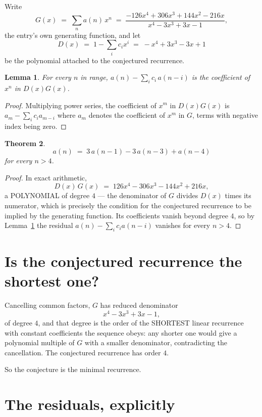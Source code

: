 \documentclass[11pt,a4paper]{article}
\theoremstyle{plain}
\newtheorem{theorem}{Theorem}
\newtheorem{lemma}[theorem]{Lemma}
\theoremstyle{definition}
\begin{document}
Write
\[
G(x)\;=\;\sum_{n}a(n)\,x^{n}\;=\;\frac{- 126 x^{4} + 306 x^{3} + 144 x^{2} - 216 x}{x^{4} - 3 x^{3} + 3 x - 1},
\]
the entry's own generating function, and let
\[
D(x)\;=\;1-\sum_i c_i x^{i}\;=\;- x^{4} + 3 x^{3} - 3 x + 1
\]
be the polynomial attached to the conjectured recurrence.

\begin{lemma}\label{lem:key}
For every $n$ in range, $a(n)-\sum_i c_i\,a(n-i)$ is the coefficient of $x^{n}$ in
$D(x)G(x)$.
\end{lemma}

\begin{proof}
Multiplying power series, the coefficient of $x^{m}$ in $D(x)G(x)$ is
$a_m-\sum_i c_i a_{m-i}$ where $a_m$ denotes the coefficient of $x^{m}$ in $G$, terms with
negative index being zero.
\end{proof}

\begin{theorem}
\[
a(n)\;=\;3\,a(n-1) - 3\,a(n-3) + a(n-4)
\]
for every $n>4$.
\end{theorem}

\begin{proof}
In exact arithmetic,
\[
D(x)\,G(x)\;=\;126 x^{4} - 306 x^{3} - 144 x^{2} + 216 x,
\]
a POLYNOMIAL of degree $4$ --- the denominator of $G$ divides $D(x)$ times its numerator,
which is precisely the condition for the conjectured recurrence to be implied by the
generating function. Its coefficients vanish beyond degree $4$, so by
Lemma~\ref{lem:key} the residual $a(n)-\sum_ic_ia(n-i)$ vanishes for every
$n>4$.
\end{proof}

\section{Is the conjectured recurrence the shortest one?}

Cancelling common factors, $G$ has reduced denominator
\[
x^{4} - 3 x^{3} + 3 x - 1,
\]
of degree $4$, and that degree is the order of the SHORTEST linear recurrence with
constant coefficients the sequence obeys: any shorter one would give a polynomial multiple of
$G$ with a smaller denominator, contradicting the cancellation. The conjectured recurrence has
order $4$.

So the conjecture is the minimal recurrence.

\section{The residuals, explicitly}
\end{document}
